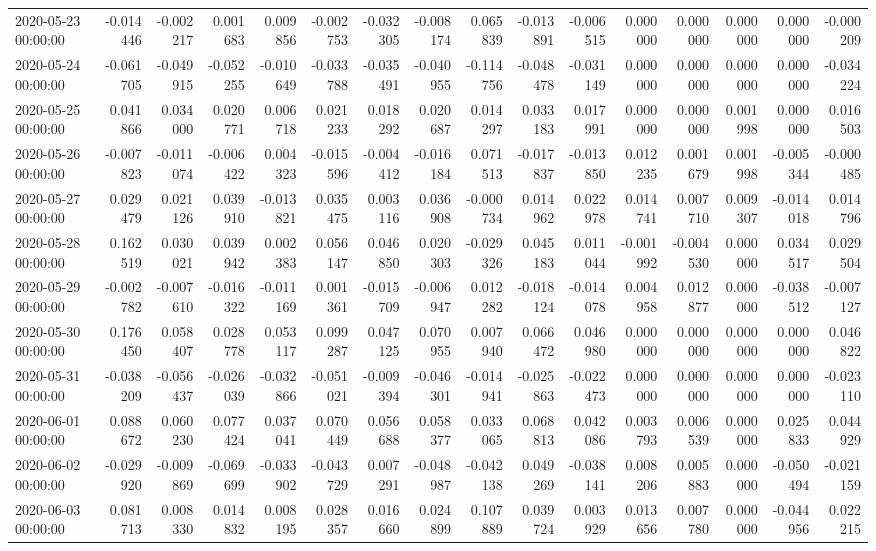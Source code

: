 \begin{tabular}{lrrrrrrrrrrrrrrr}
2020-05-23 00:00:00 & -0.014446 & -0.002217 & 0.001683 & 0.009856 & -0.002753 & -0.032305 & -0.008174 & 0.065839 & -0.013891 & -0.006515 & 0.000000 & 0.000000 & 0.000000 & 0.000000 & -0.000209 \\
2020-05-24 00:00:00 & -0.061705 & -0.049915 & -0.052255 & -0.010649 & -0.033788 & -0.035491 & -0.040955 & -0.114756 & -0.048478 & -0.031149 & 0.000000 & 0.000000 & 0.000000 & 0.000000 & -0.034224 \\
2020-05-25 00:00:00 & 0.041866 & 0.034000 & 0.020771 & 0.006718 & 0.021233 & 0.018292 & 0.020687 & 0.014297 & 0.033183 & 0.017991 & 0.000000 & 0.000000 & 0.001998 & 0.000000 & 0.016503 \\
2020-05-26 00:00:00 & -0.007823 & -0.011074 & -0.006422 & 0.004323 & -0.015596 & -0.004412 & -0.016184 & 0.071513 & -0.017837 & -0.013850 & 0.012235 & 0.001679 & 0.001998 & -0.005344 & -0.000485 \\
2020-05-27 00:00:00 & 0.029479 & 0.021126 & 0.039910 & -0.013821 & 0.035475 & 0.003116 & 0.036908 & -0.000734 & 0.014962 & 0.022978 & 0.014741 & 0.007710 & 0.009307 & -0.014018 & 0.014796 \\
2020-05-28 00:00:00 & 0.162519 & 0.030021 & 0.039942 & 0.002383 & 0.056147 & 0.046850 & 0.020303 & -0.029326 & 0.045183 & 0.011044 & -0.001992 & -0.004530 & 0.000000 & 0.034517 & 0.029504 \\
2020-05-29 00:00:00 & -0.002782 & -0.007610 & -0.016322 & -0.011169 & 0.001361 & -0.015709 & -0.006947 & 0.012282 & -0.018124 & -0.014078 & 0.004958 & 0.012877 & 0.000000 & -0.038512 & -0.007127 \\
2020-05-30 00:00:00 & 0.176450 & 0.058407 & 0.028778 & 0.053117 & 0.099287 & 0.047125 & 0.070955 & 0.007940 & 0.066472 & 0.046980 & 0.000000 & 0.000000 & 0.000000 & 0.000000 & 0.046822 \\
2020-05-31 00:00:00 & -0.038209 & -0.056437 & -0.026039 & -0.032866 & -0.051021 & -0.009394 & -0.046301 & -0.014941 & -0.025863 & -0.022473 & 0.000000 & 0.000000 & 0.000000 & 0.000000 & -0.023110 \\
2020-06-01 00:00:00 & 0.088672 & 0.060230 & 0.077424 & 0.037041 & 0.070449 & 0.056688 & 0.058377 & 0.033065 & 0.068813 & 0.042086 & 0.003793 & 0.006539 & 0.000000 & 0.025833 & 0.044929 \\
2020-06-02 00:00:00 & -0.029920 & -0.009869 & -0.069699 & -0.033902 & -0.043729 & 0.007291 & -0.048987 & -0.042138 & 0.049269 & -0.038141 & 0.008206 & 0.005883 & 0.000000 & -0.050494 & -0.021159 \\
2020-06-03 00:00:00 & 0.081713 & 0.008330 & 0.014832 & 0.008195 & 0.028357 & 0.016660 & 0.024899 & 0.107889 & 0.039724 & 0.003929 & 0.013656 & 0.007780 & 0.000000 & -0.044956 & 0.022215 \\

\end{tabular}
